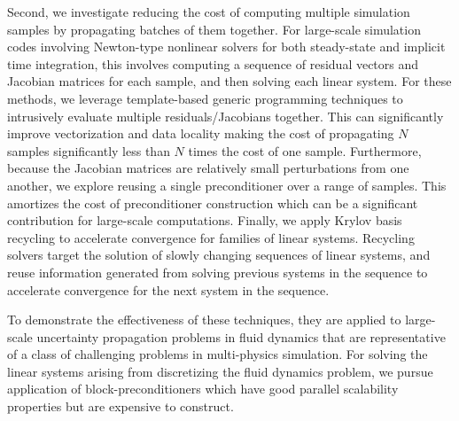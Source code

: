 \documentclass{report}
\begin{document}
Second, we investigate reducing the cost of computing multiple
simulation samples by propagating batches of them together.
For large-scale simulation codes involving Newton-type nonlinear
solvers for both steady-state and implicit time integration,
this involves computing a sequence of residual vectors and
Jacobian matrices for each sample, and then solving each
linear system. For these methods, we leverage
template-based generic programming techniques to intrusively evaluate
multiple residuals/Jacobians together. This can significantly improve
vectorization and data locality making the cost of propagating $N$
samples significantly less than $N$ times the cost of one sample.
Furthermore, because the Jacobian matrices are relatively small
perturbations from one another, we explore reusing a single
preconditioner over
a range of samples. This amortizes the cost of preconditioner
construction which can be a significant contribution for large-scale
computations.
Finally, we apply Krylov basis recycling to accelerate convergence for
families of linear systems. Recycling solvers target the solution of
slowly changing sequences of linear systems, and reuse information
generated from solving previous systems in the sequence to accelerate
convergence for the next system in the sequence.

To demonstrate the effectiveness of these techniques, they are applied
to large-scale uncertainty propagation problems in fluid dynamics that
are representative of a class of challenging problems
in multi-physics simulation. For solving the linear systems arising from
discretizing the fluid dynamics problem, we pursue application of
block-preconditioners which have good parallel scalability properties but
are expensive to construct.
\end{document}
